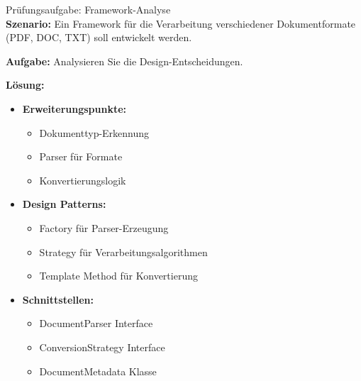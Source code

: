 \begin{example2}[breakable]{Prüfungsaufgabe: Framework-Analyse}\\
\textbf{Szenario:}
Ein Framework für die Verarbeitung verschiedener Dokumentformate (PDF, DOC, TXT) 
soll entwickelt werden.

\textbf{Aufgabe:}
Analysieren Sie die Design-Entscheidungen.

\textbf{Lösung:}
\begin{itemize}
    \item \textbf{Erweiterungspunkte:}
    \begin{itemize}
        \item Dokumenttyp-Erkennung
        \item Parser für Formate
        \item Konvertierungslogik
    \end{itemize}
    
    \item \textbf{Design Patterns:}
    \begin{itemize}
        \item Factory für Parser-Erzeugung
        \item Strategy für Verarbeitungsalgorithmen
        \item Template Method für Konvertierung
    \end{itemize}
    
    \item \textbf{Schnittstellen:}
    \begin{itemize}
        \item DocumentParser Interface
        \item ConversionStrategy Interface
        \item DocumentMetadata Klasse
    \end{itemize}
\end{itemize}
\end{example2}